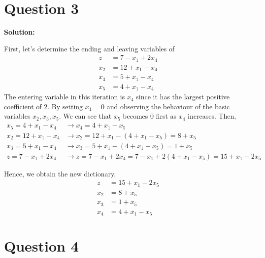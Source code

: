 \documentclass[11pt]{article}
\newenvironment{solution}
  {\par\noindent\textbf{Solution:}\par}
  {\par}
\begin{document}
\section*{Question 3}
\begin{solution}
  First, let's determine the ending and leaving variables of 
\[
  \begin{aligned}
    z &= 7-x_1+2x_4 \\ 
    x_2 &= 12 + x_1 - x_4 \\ 
    x_3 &= 5 + x_1 -x_4 \\ 
    x_5 &= 4 +x_1 -x_4
  \end{aligned}
\]
The entering variable in this iteration is $x_4$ since it has the largest positive coefficient of 2. 
By setting $x_1=0$ and observing the behaviour of the basic variables $x_2,x_3,x_5$. We can see that $x_5$ becomes 0 first as $x_4$ increases.
Then,
\[
  \begin{aligned}
    x_5 = 4 + x_1 -x_4 &\to x_4 = 4 + x_1 -x_5 \\ 
    x_2 = 12 + x_1 - x_4 &\to x_2 = 12 + x_1 - (4 + x_1 - x_5) = 8 +x_5 \\ 
    x_3 = 5 + x_1 -x_4 &\to x_3 = 5 + x_1 - (4+x_1-x_5) = 1 + x_5 \\ 
    z = 7 - x_1 + 2x_4 &\to z = 7-x_1 +2x_4 = 7 - x_1 + 2(4+x_1-x_5) = 15 +x_1 -2x_5
  \end{aligned}
\]

Hence, we obtain the new dictionary,
\[
  \begin{aligned}
    z &= 15+x_1 - 2x_5 \\ 
    x_2 &= 8 + x_5  \\ 
    x_3 &= 1+x_5 \\ 
    x_4 &= 4+x_1-x_5
  \end{aligned}
\]
\end{solution}



\section*{Question 4}
\end{document}
